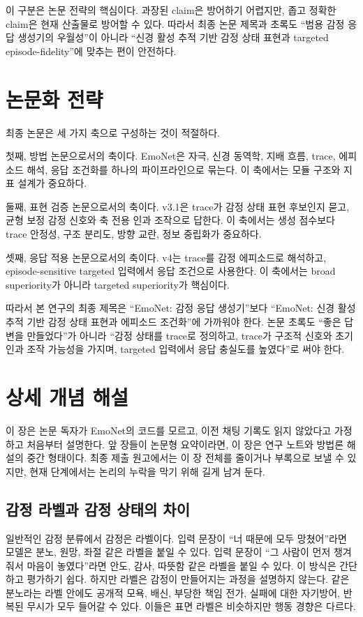 \documentclass[11pt,a4paper]{article}
\begin{document}
이 구분은 논문 전략의 핵심이다. 과장된 claim은 방어하기 어렵지만, 좁고 정확한 claim은 현재 산출물로 방어할 수 있다. 따라서 최종 논문 제목과 초록도 ``범용 감정 응답 생성기의 우월성''이 아니라 ``신경 활성 추적 기반 감정 상태 표현과 targeted episode-fidelity''에 맞추는 편이 안전하다.

\section{논문화 전략}

최종 논문은 세 가지 축으로 구성하는 것이 적절하다.

첫째, 방법 논문으로서의 축이다. EmoNet은 자극, 신경 동역학, 지배 흐름, trace, 에피소드 해석, 응답 조건화를 하나의 파이프라인으로 묶는다. 이 축에서는 모듈 구조와 지표 설계가 중요하다.

둘째, 표현 검증 논문으로서의 축이다. v3.1은 trace가 감정 상태 표현 후보인지 묻고, 균형 보정 감정 신호와 축 전용 인과 조작으로 답한다. 이 축에서는 생성 점수보다 trace 안정성, 구조 분리도, 방향 교란, 정보 중립화가 중요하다.

셋째, 응답 적용 논문으로서의 축이다. v4는 trace를 감정 에피소드로 해석하고, episode-sensitive targeted 입력에서 응답 조건으로 사용한다. 이 축에서는 broad superiority가 아니라 targeted superiority가 핵심이다.

따라서 본 연구의 최종 제목은 ``EmoNet: 감정 응답 생성기''보다 ``EmoNet: 신경 활성 추적 기반 감정 상태 표현과 에피소드 조건화''에 가까워야 한다. 논문 초록도 ``좋은 답변을 만들었다''가 아니라 ``감정 상태를 trace로 정의하고, trace가 구조적 신호와 초기 인과 조작 가능성을 가지며, targeted 입력에서 응답 충실도를 높였다''로 써야 한다.

\section{상세 개념 해설}

이 장은 논문 독자가 EmoNet의 코드를 모르고, 이전 채팅 기록도 읽지 않았다고 가정하고 처음부터 설명한다. 앞 장들이 논문형 요약이라면, 이 장은 연구 노트와 방법론 해설의 중간 형태이다. 최종 제출 원고에서는 이 장 전체를 줄이거나 부록으로 보낼 수 있지만, 현재 단계에서는 논리의 누락을 막기 위해 길게 남겨 둔다.

\subsection{감정 라벨과 감정 상태의 차이}

일반적인 감정 분류에서 감정은 라벨이다. 입력 문장이 ``너 때문에 모두 망쳤어''라면 모델은 분노, 원망, 좌절 같은 라벨을 붙일 수 있다. 입력 문장이 ``그 사람이 먼저 챙겨줘서 마음이 놓였다''라면 안도, 감사, 따뜻함 같은 라벨을 붙일 수 있다. 이 방식은 간단하고 평가하기 쉽다. 하지만 라벨은 감정이 만들어지는 과정을 설명하지 않는다. 같은 분노라는 라벨 안에도 공개적 모욕, 배신, 부당한 책임 전가, 실패에 대한 자기방어, 반복된 무시가 모두 들어갈 수 있다. 이들은 표면 라벨은 비슷하지만 행동 경향은 다르다.
\end{document}
